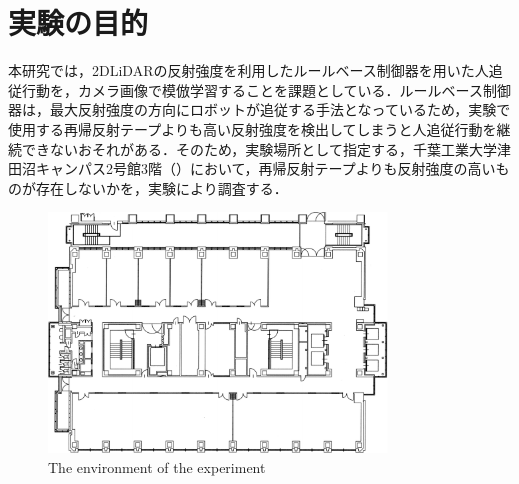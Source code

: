 
\section{実験の目的}

  本研究では，2DLiDARの反射強度を利用したルールベース制御器を用いた人追従行動を，カメラ画像で模倣学習することを課題としている．ルールベース制御器は，最大反射強度の方向にロボットが追従する手法となっているため，実験で使用する再帰反射テープよりも高い反射強度を検出してしまうと人追従行動を継続できないおそれがある．そのため，実験場所として指定する，千葉工業大学津田沼キャンパス2号館3階（）において，再帰反射テープよりも反射強度の高いものが存在しないかを，実験により調査する．

\vspace{2cm}

  \begin{figure}[h]
    \centering
    \includegraphics[width=9cm] {images/pdf/RobotGuidance_cit3f}
    \captionsetup{justification=raggedright} %
    \caption{The environment of the experiment}
    \label{Fig:RobotGuidance_cit3f}
  \end{figure}

\newpage